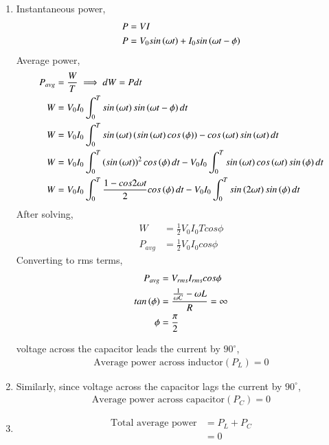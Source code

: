 \documentclass[a4,12pt,onecolumn]{IEEEtran}
\begin{document}
\begin{enumerate}
    \item Instantaneous power,
    \begin{align}
        P &= VI \\
        P &= V_0sin\left(\omega t\right) + I_0 sin\left(\omega t - \phi\right)
    \end{align}
    Average power,
    \begin{align}
    P_{avg} &= \frac{W}{T} \implies dW = Pdt \\
    W &= V_0 I_0 \int_{0}^{T} sin\left(\omega t\right) sin\left(\omega t - \phi\right) dt \\
     W &= V_0 I_0 \int_{0}^{T} sin\left(\omega t\right)\left(sin\left(\omega t\right)cos\left(\phi\right)\right) - cos\left(\omega t\right)sin\left(\omega t\right) dt\\
       W &= V_0 I_0 \int_{0}^{T} \left(sin\left(\omega t\right)\right)^2 cos\left(\phi\right)dt - V_0 I_0\int_{0}^{T}sin\left(\omega t\right)cos\left(\omega t\right)sin\left(\phi\right) dt\\
        W &= V_0 I_0 \int_{0}^{T} \frac{1-cos{2 \omega t}}{2} cos\left(\phi\right)dt - V_0 I_0\int_{0}^{T}sin\left(2 \omega t\right)sin\left(\phi\right)dt
    \end{align}
After solving,
    \begin{align}
        W &= \frac{1}{2} V_0 I_0 T cos{\phi} \\
        P_{avg} &=\frac{1}{2} V_0 I_0 cos{\phi}
    \end{align}
    Converting to rms terms,
    \begin{align}
      P_{avg} &= V_{rms} I_{rms} cos{\phi} \\
      tan\left(\phi\right) &= \frac{\frac{1}{\omega C} -\omega L}{R} = \infty\\
      \phi &= \frac{\pi}{2} 
    \end{align}

 voltage across the capacitor leads the current by $90^\circ$,
    \begin{align}
        \text{Average power across inductor} (P_L) = 0
    \end{align}

    \item 
    Similarly, since voltage across the capacitor lags the current by $90^\circ$,
    \begin{align}
        \text{Average power across capacitor} (P_C) = 0
    \end{align}

    \item 
    \begin{align}
        \text{Total average power} &= P_L + P_C \\
        &= 0
    \end{align}
\end{enumerate}
\end{document}
